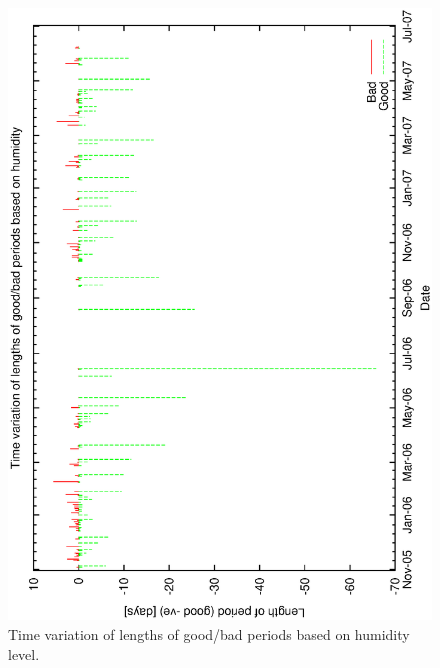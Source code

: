 \documentclass[12pt,a4paper]{article}
\begin{document}
{\begin{figure}[htbp]
\begin{center}
    \includegraphics[scale=0.4, angle=-90]{figures/ecs/gbc_period.eps}
\end{center}
\caption[Time variation of lengths of good/bad periods based on humidity level.]
{Time variation of lengths of good/bad periods based on humidity level.}
\label{fig:good_bad_period_time}
\end{figure}


}
\end{document}
